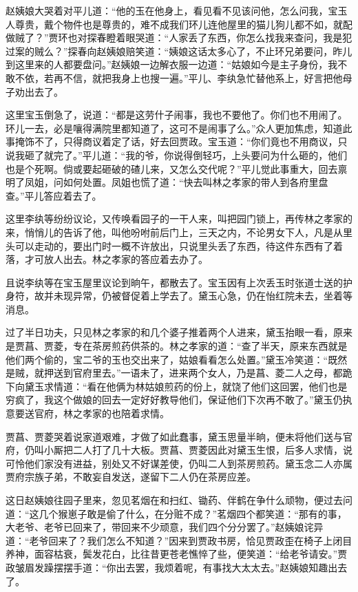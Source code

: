 \documentclass[12pt,oneside]{book}
\begin{document}
赵姨娘大哭着对平儿道：“他的玉在他身上，看见看不见该问他，怎么问我，宝玉人尊贵，戴个物件也是尊贵的，难不成我们环儿连他屋里的猫儿狗儿都不如，就配做贼了？”贾环也对探春瞪着眼哭道：“人家丢了东西，你怎么找我来查问，我是犯过案的贼么？”探春向赵姨娘赔笑道：“姨娘这话太多心了，不止环兄弟要问，昨儿到这里来的人都要盘问。”赵姨娘一边解衣服一边道：“姑娘如今是主子身份，我不敢不依，若再不信，就把我身上也搜一遍。”平儿、李纨急忙替他系上，好言把他母子劝出去了。

这里宝玉倒急了，说道：“都是这劳什子闹事，我也不要他了。你们也不用闹了。环儿一去，必是嚷得满院里都知道了，这可不是闹事了么。”众人更加焦虑，知道此事掩饰不了，只得商议着定了话，好去回贾政。宝玉道：“你们竟也不用商议，只说我砸了就完了。”平儿道：“我的爷，你说得倒轻巧，上头要问为什么砸的，他们也是个死啊。倘或要起砸破的碴儿来，又怎么交代呢？”平儿觉此事重大，回去禀明了凤姐，问如何处置。凤姐也慌了道：“快去叫林之孝家的带人到各府里盘查。”平儿答应着去了。

这里李纨等纷纷议论，又传唤看园子的一干人来，叫把园门锁上，再传林之孝家的来，悄悄儿的告诉了他，叫他吩咐前后门上，三天之内，不论男女下人，凡是从里头可以走动的，要出门时一概不许放出，只说里头丢了东西，待这件东西有了着落，才可放人出去。林之孝家的答应着去办了。

且说李纨等在宝玉屋里议论到晌午，都散去了。宝玉因有上次丢玉时张道士送的护身符，故并未现异常，仍被督促着上学去了。黛玉心急，仍在怡红院未去，坐着等消息。

过了半日功夫，只见林之孝家的和几个婆子推着两个人进来，黛玉抬眼一看，原来是贾菖、贾菱，专在茶房煎药供茶的。林之孝家的道：“查了半天，原来东西就是他们两个偷的，宝二爷的玉也交出来了，姑娘看看怎么处置。”黛玉冷笑道：“既然是贼，就押送到官府里去。”一语未了，进来两个女人，乃是菖、菱二人之母，都跪下向黛玉求情道：“看在他俩为林姑娘煎药的份上，就饶了他们这回罢，他们也是穷疯了，我这个做娘的回去一定好好教导他们，保证他们下次再不敢了。”黛玉仍执意要送官府，林之孝家的也陪着求情。

贾菖、贾菱哭着说家道艰难，才做了如此蠢事，黛玉思量半晌，便未将他们送与官府，仍叫小厮把二人打了几十大板。贾菖、贾菱因此对黛玉生恨，后多人求情，说可怜他们家没有进益，别处又不好谋差使，仍叫二人到茶房煎药。黛玉念二人亦属贾府宗族子弟，不敢妄自发送，遂留下二人仍在茶房应差。

这日赵姨娘往园子里来，忽见茗烟在和扫红、锄药、伴鹤在争什么顽物，便过去问道：“这几个猴崽子敢是偷了什么，在分赃不成？”茗烟四个都笑道：“那有的事，大老爷、老爷已回来了，带回来不少顽意，我们四个分分罢了。”赵姨娘诧异道：“老爷回来了？我们怎么不知道？”因来到贾政书房，恰见贾政歪在椅子上闭目养神，面容枯衰，鬓发花白，比往昔更苍老憔悴了些，便笑道：“给老爷请安。”贾政皱眉发躁摆摆手道：“你出去罢，我烦着呢，有事找大太太去。”赵姨娘知趣出去了。
\end{document}
